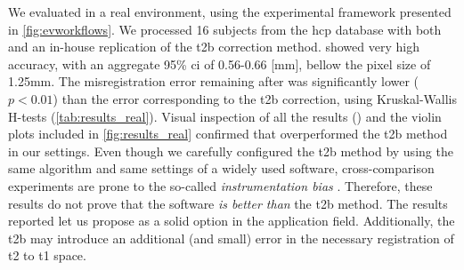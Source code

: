 We evaluated \regseg{} in a real environment, using the experimental framework presented
  in \autoref{fig:evworkflows}.
We processed 16 subjects from the \gls*{hcp} database with both \regseg{}
  and an in-house replication of the \gls*{t2b} correction method.
\Regseg{} showed very high accuracy, with an aggregate 95\% \gls*{ci} of 0.56-0.66 [mm],
  bellow the pixel size of 1.25mm.
The misregistration error remaining after \regseg{} was significantly lower ($p < 0.01$) than the
  error corresponding to the \gls*{t2b} correction, using Kruskal-Wallis H-tests
  (\autoref{tab:results_real}).
Visual inspection of all the results () and the violin plots included in
  \autoref{fig:results_real} confirmed that \regseg{} overperformed the \gls*{t2b} method
  in our settings.
Even though we carefully configured the \gls*{t2b} method by using the same algorithm and
  same settings of a widely used software, cross-comparison experiments are prone to
  the so-called \emph{instrumentation bias} \citep{tustison_instrumentation_2013}.
Therefore, these results do not prove that the \regseg{} software \emph{is better than} the
  \gls*{t2b} method.
The results reported let us propose \regseg{} as a solid option in the application field.
Additionally, the \gls*{t2b} may introduce an additional (and small) error in the necessary
  registration of \gls*{t2} to \gls*{t1} space.

